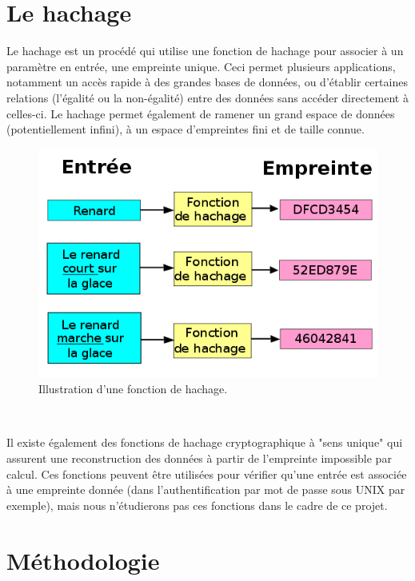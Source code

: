 \documentclass[final,twoside,twocolumn,10pt]{scrartcl}
\begin{document}
\section{Le hachage}
	Le hachage est un procédé qui utilise une fonction de hachage pour associer à un paramètre en entrée, une empreinte unique. Ceci permet plusieurs applications, notamment un accès rapide à des grandes bases de données, ou d'établir certaines relations (l'égalité ou la non-égalité) entre des données sans accéder directement à celles-ci. Le hachage permet également de ramener un grand espace de données (potentiellement infini), à un espace d'empreintes fini et de taille connue.\\
	\begin{figure}[h!]
		\begin{center}
			\includegraphics[scale=0.3]{figures/hash}
		\end{center}
		\caption{Illustration d'une fonction de hachage.}
		\label{fig:1}
	\end{figure}\\
	\par Il existe également des fonctions de hachage cryptographique à "sens unique" qui assurent une reconstruction des données à partir de l'empreinte impossible par calcul. Ces fonctions peuvent être utilisées pour vérifier qu'une entrée est associée à une empreinte donnée (dans l'authentification par mot de passe sous UNIX par exemple), mais nous n'étudierons pas ces fonctions dans le cadre de ce projet.
	
	
\section{Méthodologie}
\end{document}

